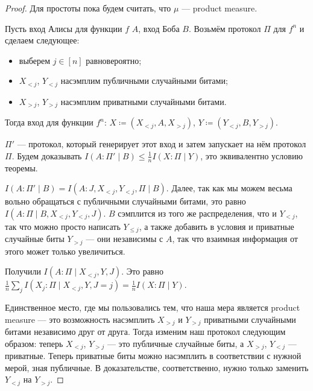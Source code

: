 \begin{proof}
    Для простоты пока будем считать, что $\mu$ --- product measure.

    Пусть вход Алисы для функции $f$ $A$, вход Боба $B$. Возьмём протокол $\Pi$ для $f^n$ и сделаем
    следующее:
    \begin{itemize}
        \item выберем $j \in [n]$ равновероятно;
        \item $X_{< j}$, $Y_{< j}$ насэмплим публичными случайными битами;
        \item $X_{> j}$, $Y_{> j}$ насэмплим приватными случайными битами.
    \end{itemize}

    Тогда вход для функции $f^n$: $X \coloneqq (X_{< j}, A, X_{> j})$, $Y \coloneqq (Y_{< j}, B,
    Y_{> j})$.

    $\Pi'$ --- протокол, который генерирует этот вход и затем запускает на нём протокол $\Pi$. Будем
    доказывать $I(A : \Pi' \mid B) \le \frac{1}{n} I(X : \Pi \mid Y)$, это эквивалентно условию теоремы.

    $I(A : \Pi' \mid B) = I(A : J, X_{< j}, Y_{< j}, \Pi \mid B)$. Далее, так как мы можем весьма вольно
    обращаться с публичными случайными битами, это равно $I(A : \Pi \mid B, X_{< j}, Y_{< j}, J)$. $B$
    сэмплится из того же распределения, что и $Y_{< j}$, так что можно просто написать $Y_{\leq j}$, а
    также добавить в условия и приватные случайные биты $Y_{> j}$ --- они независимы с $A$, так что
    взаимная информация от этого может только увеличиться.

    Получили $I(A : \Pi \mid X_{< j}, Y, J)$. Это равно
    $\frac{1}{n} \sum\limits_{j} I(X_j : \Pi \mid X_{< j}, Y, J = j) = \frac{1}{n} I(X : \Pi \mid Y)$.

    Единственное место, где мы пользовались тем, что наша мера является product measure --- это
    возможность насэмплить $X_{> j}$ и $Y_{> j}$ приватными случайными битами независимо друг от
    друга. Тогда изменим наш протокол следующим образом: теперь $X_{< j}$, $Y_{> j}$ --- это публичные
    случайные биты, а $X_{> j}$, $Y_{< j}$ --- приватные. Теперь приватные биты можно насэмплить в
    соответствии с нужной мерой, зная публичные. В доказательстве, соответственно, нужно только заменить
    $Y_{< j}$ на $Y_{> j}$. 
\end{proof}
